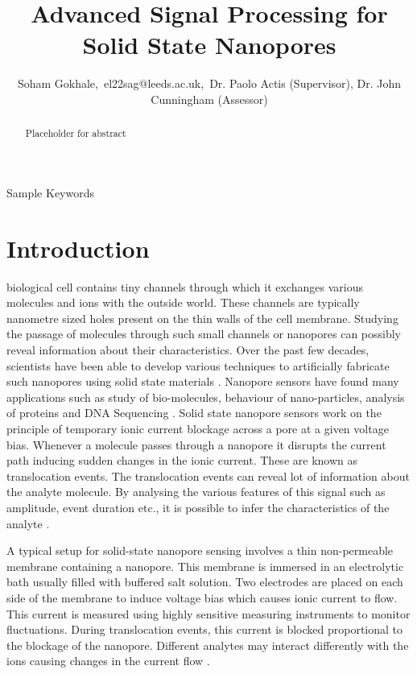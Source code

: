 \documentclass[journal]{IEEEtran}
\begin{document}
\title{Advanced Signal Processing for Solid State Nanopores}
\author{Soham Gokhale,\ el22sag@leeds.ac.uk,\ Dr. Paolo Actis (Supervisor), Dr. John Cunningham (Assessor)}


\maketitle

\begin{abstract}
Placeholder for abstract
\end{abstract}

\begin{IEEEkeywords}
Sample Keywords
\end{IEEEkeywords}

\section{Introduction}
biological cell contains tiny channels through which it exchanges various molecules and ions with the outside world. These channels are typically nanometre sized holes present on the thin walls of the cell membrane. Studying the passage of molecules through such small channels or nanopores can possibly reveal information about their characteristics. Over the past few decades, scientists have been able to develop various techniques to artificially fabricate such nanopores using solid state materials \cite{dekkerSolidstateNanopores2007,xueSolidstateNanoporeSensors2020}. Nanopore sensors have found many applications such as study of bio-molecules, behaviour of nano-particles, analysis of proteins \cite{luoApplicationSolidStateNanopore2020} and DNA Sequencing \cite{deamerThreeDecadesNanopore2016}. Solid state nanopore sensors work on the principle of temporary ionic current blockage across a pore at a given voltage bias. Whenever a molecule passes through a nanopore it disrupts the current path inducing sudden changes in the ionic current. These are known as translocation events. The translocation events can reveal lot of information about the analyte molecule. By analysing the various features of this signal such as amplitude, event duration etc., it is possible to infer the characteristics of the analyte \cite{wenGuideSignalProcessing2021}.

A typical setup for solid-state nanopore sensing involves a thin non-permeable membrane containing a nanopore. This membrane is immersed in an electrolytic bath usually filled with buffered salt solution. Two electrodes are placed on each side of the membrane to induce voltage bias which causes ionic current to flow. This current is measured using highly sensitive measuring instruments to monitor fluctuations. During translocation events, this current is blocked proportional to the blockage of the nanopore. Different analytes may interact differently with the ions causing changes in the current flow \cite{xueSolidstateNanoporeSensors2020}.
\end{document}
